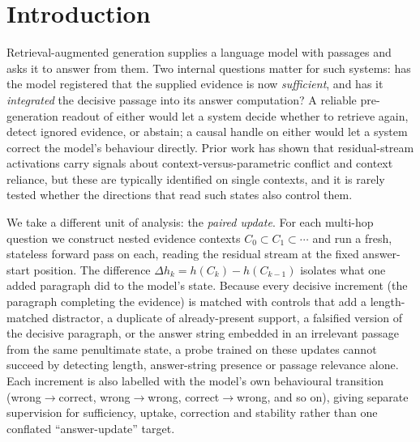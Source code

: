 \section{Introduction}
Retrieval-augmented generation supplies a language model with passages and asks it to answer from them. Two internal questions matter for such systems: has the model registered that the supplied evidence is now \emph{sufficient}, and has it \emph{integrated} the decisive passage into its answer computation? A reliable pre-generation readout of either would let a system decide whether to retrieve again, detect ignored evidence, or abstain; a causal handle on either would let a system correct the model's behaviour directly. Prior work has shown that residual-stream activations carry signals about context-versus-parametric conflict and context reliance, but these are typically identified on single contexts, and it is rarely tested whether the directions that read such states also control them.

We take a different unit of analysis: the \emph{paired update}. For each multi-hop question we construct nested evidence contexts $C_0\subset C_1\subset\cdots$ and run a fresh, stateless forward pass on each, reading the residual stream at the fixed answer-start position. The difference $\Delta h_{k}=h(C_k)-h(C_{k-1})$ isolates what one added paragraph did to the model's state. Because every decisive increment (the paragraph completing the evidence) is matched with controls that add a length-matched distractor, a duplicate of already-present support, a falsified version of the decisive paragraph, or the answer string embedded in an irrelevant passage from the same penultimate state, a probe trained on these updates cannot succeed by detecting length, answer-string presence or passage relevance alone. Each increment is also labelled with the model's own behavioural transition (wrong$\to$correct, wrong$\to$wrong, correct$\to$wrong, and so on), giving separate supervision for sufficiency, uptake, correction and stability rather than one conflated ``answer-update'' target.

